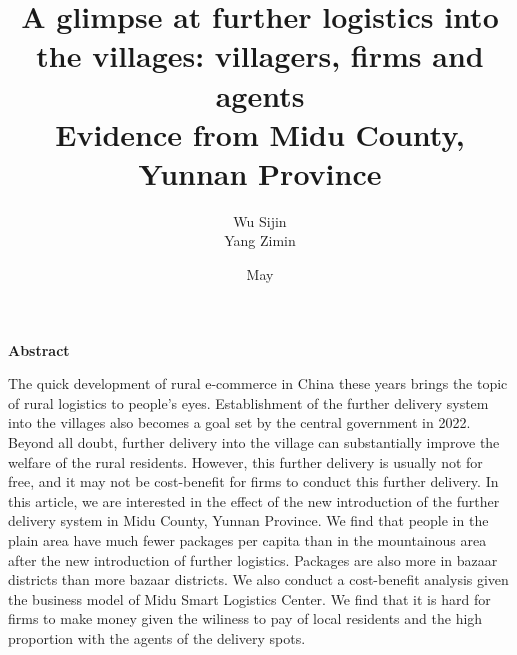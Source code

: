 \documentclass{article}
\title{\bfseries \sihao A glimpse at further logistics into the villages: villagers, firms and agents\\
Evidence from Midu County, Yunnan Province}
\author{\xiaosi Wu Sijin\\Yang Zimin}
\date{\xiaosi May\quad2022}
\newcommand{\xiaosi}{\fontsize{12pt}{18pt}\selectfont}           %
\begin{document}
\maketitle
\begin{center}
{\bfseries\xiaosi Abstract}
\end{center}
\normalsize
The quick development of rural e-commerce in China these years brings the topic of rural logistics to people’s eyes. Establishment of the further delivery system into the villages also becomes a goal set by the central government in 2022. Beyond all doubt, further delivery into the village can substantially improve the welfare of the rural residents. However, this further delivery is usually not for free, and it may not be cost-benefit for firms to conduct this further delivery. In this article, we are interested in the effect of the new introduction of the further delivery system in Midu County, Yunnan Province. We find that people in the plain area have much fewer packages per capita than in the mountainous area after the new introduction of further logistics. Packages are also more in bazaar districts than more bazaar districts. We also conduct a cost-benefit analysis given the business model of Midu Smart Logistics Center. We find that it is hard for firms to make money given the wiliness to pay of local residents and the high proportion with the agents of the delivery spots.
\end{document}
